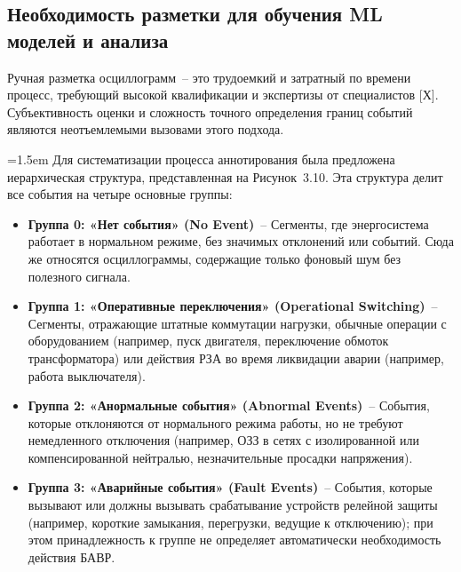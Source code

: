 \subsection{Необходимость разметки для обучения ML моделей и анализа}\label{sec:ch3_annotation_necessity}

Ручная разметка осциллограмм~-- это трудоемкий и затратный по времени процесс, требующий высокой квалификации и экспертизы от специалистов [Х]. Субъективность оценки и сложность точного определения границ событий являются неотъемлемыми вызовами этого подхода.

{\emergencystretch=1.5em Для систематизации процесса аннотирования была предложена иерархическая структура, представленная на Рисунок~3.10. Эта структура делит все события на четыре основные группы:\par}

\begin{itemize}
  \item \textbf{Группа 0: «Нет события» (No Event)}~-- Сегменты, где энергосистема работает в нормальном режиме, без значимых отклонений или событий. Сюда же относятся осциллограммы, содержащие только фоновый шум без полезного сигнала.
  \item \textbf{Группа 1: «Оперативные переключения» (Operational Switching)}~-- Сегменты, отражающие штатные коммутации нагрузки, обычные операции с оборудованием (например, пуск двигателя, переключение обмоток трансформатора) или действия РЗА во время ликвидации аварии (например, работа выключателя).
  \item \textbf{Группа 2: «Анормальные события» (Abnormal Events)}~-- События, которые отклоняются от нормального режима работы, но не требуют немедленного отключения (например, ОЗЗ в сетях с изолированной или компенсированной нейтралью, незначительные просадки напряжения).
  \item \textbf{Группа 3: «Аварийные события» (Fault Events)}~-- События, которые вызывают или должны вызывать срабатывание устройств релейной защиты (например, короткие замыкания, перегрузки, ведущие к отключению); при этом принадлежность к группе не определяет автоматически необходимость действия БАВР.
\end{itemize}

